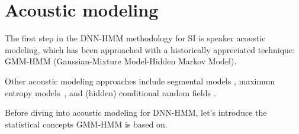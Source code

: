 \section{Acoustic modeling}\label{sec:acoustic_modeling}
The first step in the DNN-HMM methodology for SI is speaker acoustic modeling, which has been approached with a historically appreciated technique: GMM-HMM (Gaussian-Mixture Model-Hidden Markov Model).

Other acoustic modeling approaches include segmental models \cite{am:segmental}, maximum entropy models~\cite{am:entropy}, and (hidden) conditional random fields \cite{am:randomfields}.

Before diving into acoustic modeling for DNN-HMM, let's introduce the statistical concepts GMM-HMM is based on.





